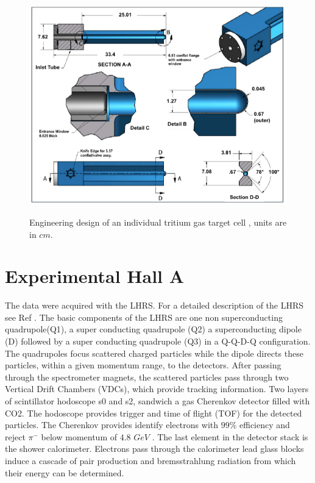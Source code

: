 \documentclass[final,5p,times,twocolumn]{elsarticle}
\begin{document}
\begin{figure}[!h]
\centering
  \includegraphics[width=13cm]{images/tritium_cell.jpg}\\
  \caption{Engineering design of an individual tritium gas target cell \cite{celldes}, units are in $cm$.
 }\label{cell}
\end{figure}


\section{Experimental Hall A}

The data were acquired with the LHRS. For a detailed description of the LHRS see Ref \cite{Alcorn:2004sb}. The basic components of the LHRS are one non superconducting quadrupole(Q1), a super conducting quadrupole (Q2) a superconducting dipole (D) followed by a super conducting quadrupole (Q3) in a Q-Q-D-Q configuration. The quadrupoles focus scattered charged particles while the dipole directs these particles, within a given momentum range, to the detectors. After passing through the spectrometer magnets, the scattered particles pass through two Vertical Drift Chambers (VDCs), which provide tracking information. Two layers of scintillator hodoscope s0 and s2, sandwich a gas Cherenkov detector filled with CO2. The hodoscope provides trigger and time of flight (TOF) for the detected particles. The Cherenkov provides identify electrons with $99 \%$  efficiency and reject $\pi^{-}$ below momentum of $4.8$ $GeV$ . The last element in the detector stack is the shower calorimeter. Electrons pass through the calorimeter lead glass blocks induce a cascade of pair production and bremsstrahlung radiation from which their energy can be determined\cite{Alcorn:2004sb}.
\end{document}
